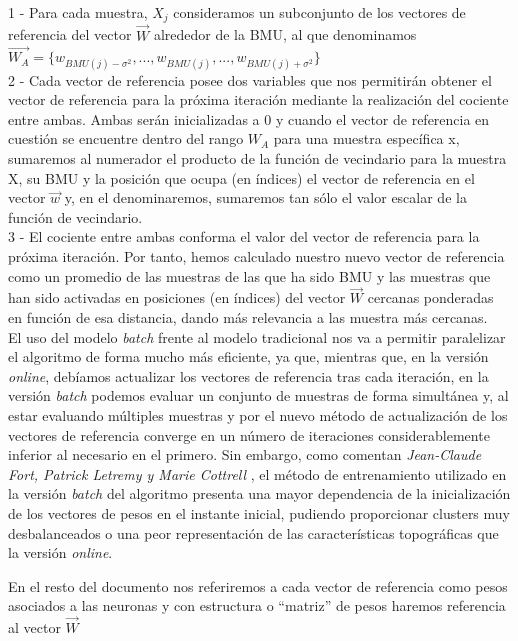 1 - Para cada muestra, $X_j$ consideramos un subconjunto de los vectores de referencia del vector $\vec{W}$ alrededor de la BMU, al que denominamos $\vec{W_A} = \{w_{BMU(j)-\sigma^2}, ..., w_{BMU(j)}, ..., w_{BMU(j)+ \sigma^2} \}$\\

2 - Cada vector de referencia posee dos variables que nos permitirán obtener el vector de referencia para la próxima iteración mediante la realización del cociente entre ambas. Ambas serán inicializadas a 0 y cuando el vector de referencia en cuestión se encuentre dentro del rango $W_A$ para una muestra específica x, sumaremos al numerador el producto de la función de vecindario para la muestra X, su BMU y la posición que ocupa (en índices) el vector de referencia en el vector $\vec{w}$ y, en el denominaremos, sumaremos tan sólo el valor escalar de la función de vecindario. \\

3 - El cociente entre ambas conforma el valor del vector de referencia para la próxima iteración. Por tanto, hemos calculado nuestro nuevo vector de referencia como un promedio de las muestras de las que ha sido BMU y las muestras que han sido activadas en posiciones (en índices) del vector $\vec{W}$ cercanas ponderadas en función de esa distancia, dando más relevancia a las muestra más cercanas.\\

El uso del modelo \textit{batch} frente al modelo tradicional nos va a permitir paralelizar el algoritmo de forma mucho más eficiente, ya que, mientras que, en la versión \textit{online}, debíamos actualizar los vectores de referencia tras cada iteración, en la versión \textit{batch} podemos evaluar un conjunto de muestras de forma simultánea y, al estar evaluando múltiples muestras y por el nuevo método de actualización de los vectores de referencia converge en un número de iteraciones considerablemente inferior al necesario en el primero. Sin embargo, como comentan \textit{Jean-Claude Fort, Patrick Letremy y Marie Cottrell} \cite{compsom}, el método de entrenamiento utilizado en la versión \textit{batch} del algoritmo presenta una mayor dependencia de la inicialización de los vectores de pesos en el instante inicial, pudiendo proporcionar clusters muy desbalanceados o una peor representación de las características topográficas que la versión \textit{online}.

En el resto del documento nos referiremos a cada vector de referencia como pesos asociados a las neuronas y con estructura o ``matriz'' de pesos haremos referencia al vector $\vec{W}$


